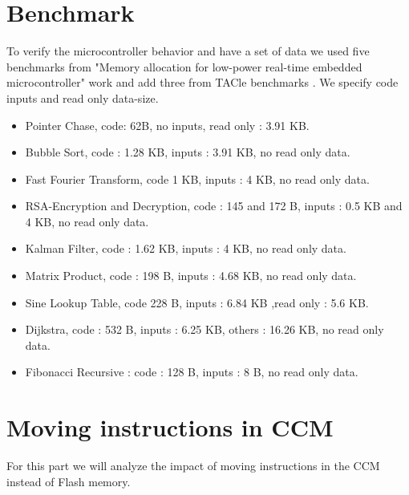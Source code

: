 \documentclass[conference]{IEEEtran}
\begin{document}
\section{Benchmark}

To verify the microcontroller behavior and have a set of data we used five
benchmarks from "Memory allocation for low-power real-time embedded
microcontroller" \cite{mem_alloc} work and add three from TACle benchmarks
\cite{benchmark}. We specify code inputs and read only data-size. 

\begin{itemize}
    \item Pointer Chase, code: 62B, no inputs, read only : 3.91 KB.
    \item Bubble Sort, code : 1.28 KB, inputs : 3.91 KB, no read only data.
    \item Fast Fourier Transform, code 1 KB, inputs : 4 KB, no read only data.
    \item RSA-Encryption and Decryption, code : 145 and 172 B, inputs : 0.5 KB
    and 4 KB, no read only data.
    \item Kalman Filter, code : 1.62 KB, inputs : 4 KB, no read only data.
    \item Matrix Product, code : 198 B, inputs : 4.68 KB, no read only data.
    \item Sine Lookup Table, code 228 B, inputs : 6.84 KB ,read only : 5.6 KB. 
    \item Dijkstra, code : 532 B, inputs : 6.25 KB, others : 16.26 KB, no read
    only data. 
    \item Fibonacci Recursive : code : 128 B, inputs : 8 B, no read only data. 
    
\end{itemize}

\section{Moving instructions in CCM}
For this part we will analyze the impact of moving instructions in the CCM
instead of Flash memory.
\end{document}
